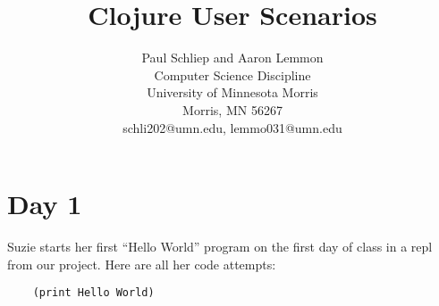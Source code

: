 \documentclass[12pt]{article}
\newcommand{\comment}[1]{}
\begin{document}
\pagestyle{plain}
%

\title{Clojure User Scenarios}
%
%

\author{
Paul Schliep and Aaron Lemmon \\
Computer Science Discipline \\
University of Minnesota Morris\\
Morris, MN 56267\\
schli202@umn.edu, lemmo031@umn.edu
}

\date{}

\maketitle
\thispagestyle{empty}




\newpage
\setcounter{page}{1}

\section{Day 1}
Suzie starts her first “Hello World” program on the first day of class in a repl from our project. Here are all her code attempts:

\begin{verbatim}
	(print Hello World)
\end{verbatim}
\end{document}
